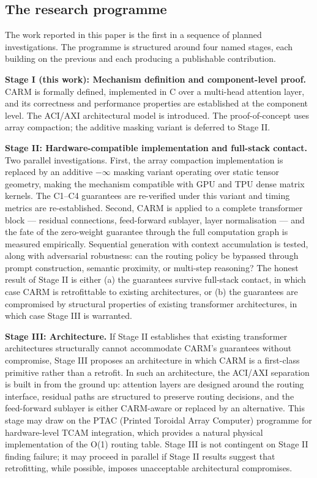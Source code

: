 \documentclass[11pt,a4paper]{article}
\theoremstyle{definition}
\begin{document}
\subsection{The research programme}
\label{sec:programme}

The work reported in this paper is the first in a sequence of planned
investigations. The programme is structured around four named stages, each
building on the previous and each producing a publishable contribution.

\textbf{Stage I (this work): Mechanism definition and component-level proof.}
CARM is formally defined, implemented in C over a multi-head attention layer,
and its correctness and performance properties are established at the component
level. The ACI/AXI architectural model is introduced. The proof-of-concept
uses array compaction; the additive masking variant is deferred to Stage II.

\textbf{Stage II: Hardware-compatible implementation and full-stack contact.}
Two parallel investigations. First, the array compaction implementation is
replaced by an additive $-\infty$ masking variant operating over static tensor
geometry, making the mechanism compatible with GPU and TPU dense matrix
kernels. The C1--C4 guarantees are re-verified under this variant and timing
metrics are re-established. Second, CARM is applied to a complete transformer
block --- residual connections, feed-forward sublayer, layer normalisation ---
and the fate of the zero-weight guarantee through the full computation graph
is measured empirically. Sequential generation with context accumulation is
tested, along with adversarial robustness: can the routing policy be bypassed
through prompt construction, semantic proximity, or multi-step reasoning?
The honest result of Stage II is either (a) the guarantees survive full-stack
contact, in which case CARM is retrofittable to existing architectures, or
(b) the guarantees are compromised by structural properties of existing
transformer architectures, in which case Stage III is warranted.

\textbf{Stage III: Architecture.} If Stage II establishes that existing
transformer architectures structurally cannot accommodate CARM's guarantees
without compromise, Stage III proposes an architecture in which CARM is a
first-class primitive rather than a retrofit. In such an architecture, the
ACI/AXI separation is built in from the ground up: attention layers are
designed around the routing interface, residual paths are structured to
preserve routing decisions, and the feed-forward sublayer is either CARM-aware
or replaced by an alternative. This stage may draw on the PTAC (Printed
Toroidal Array Computer) programme for hardware-level TCAM integration, which
provides a natural physical implementation of the O(1) routing table.
Stage III is not contingent on Stage II finding failure; it may proceed in
parallel if Stage II results suggest that retrofitting, while possible, imposes
unacceptable architectural compromises.
\end{document}
